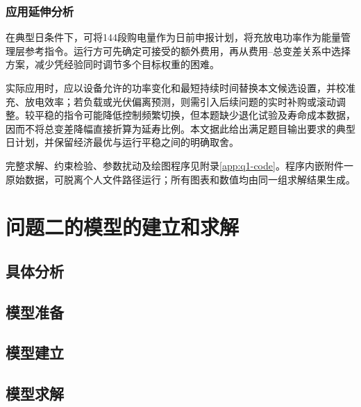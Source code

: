 \documentclass[withoutpreface,bwprint]{cumcmthesis}
\begin{document}
\subsubsection{应用延伸分析}
在典型日条件下，可将144段购电量作为日前申报计划，将充放电功率作为能量管理层参考指令。运行方可先确定可接受的额外费用，再从费用--总变差关系中选择方案，减少凭经验同时调节多个目标权重的困难。

实际应用时，应以设备允许的功率变化和最短持续时间替换本文候选设置，并校准充、放电效率；若负载或光伏偏离预测，则需引入后续问题的实时补购或滚动调整。较平稳的指令可能降低控制频繁切换，但本题缺少退化试验及寿命成本数据，因而不将总变差降幅直接折算为延寿比例。本文据此给出满足题目输出要求的典型日计划，并保留经济最优与运行平稳之间的明确取舍。

完整求解、约束检验、参数扰动及绘图程序见附录\ref{app:q1-code}。程序内嵌附件一原始数据，可脱离个人文件路径运行；所有图表和数值均由同一组求解结果生成。
\clearpage

\section{问题二的模型的建立和求解}
\subsection{具体分析}

\subsection{模型准备}

\subsection{模型建立}

\subsection{模型求解}
\end{document}
